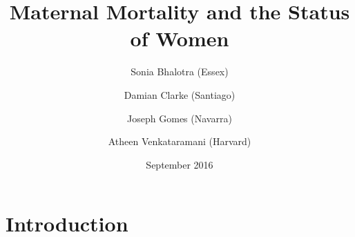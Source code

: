 \documentclass[10pt,letterpaper,subeqn]{beamer}
\title{Maternal Mortality and the Status of Women}
\author[Bhalotra et al.]{Sonia Bhalotra (Essex)
    \and Damian Clarke (Santiago) \\ \vspace{1mm}
    \and Joseph Gomes (Navarra)
    \and Atheen Venkataramani (Harvard)}
\date{September 2016}
\begin{document}
\begin{frame}
\titlepage
\end{frame}

\section{Introduction}
%
\end{document}
